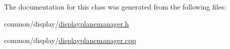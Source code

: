 The documentation for this class was generated from the following files\+:\begin{DoxyCompactItemize}
\item 
common/display/\mbox{\hyperlink{displayplanemanager_8h}{displayplanemanager.\+h}}\item 
common/display/\mbox{\hyperlink{displayplanemanager_8cpp}{displayplanemanager.\+cpp}}\end{DoxyCompactItemize}
